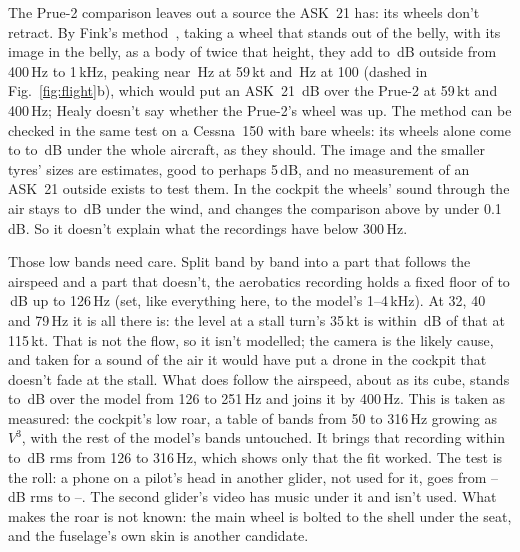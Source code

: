 \documentclass[10pt,a4paper,twocolumn]{article}
\begin{document}
The Prue-2 comparison leaves out a source the ASK~21 has: its wheels don't retract. By Fink's method~\cite{anopp}, taking a wheel that stands out of the belly, with its image in the belly, as a body of twice that height, they add \NWhLo{} to \NWhHi\,dB outside from 400\,Hz to 1\,kHz, peaking near \NWhFLo\,Hz at 59\,kt and \NWhFHi\,Hz at 100 (dashed in Fig.~\ref{fig:flight}b), which would put an ASK~21 \NWhVsPrue\,dB over the Prue-2 at 59\,kt and 400\,Hz; Healy doesn't say whether the Prue-2's wheel was up. The method can be checked in the same test on a Cessna~150 with bare wheels: its wheels alone come to \NWhCeLo{} to \NWhCeHi\,dB under the whole aircraft, as they should. The image and the smaller tyres' sizes are estimates, good to perhaps 5\,dB, and no measurement of an ASK~21 outside exists to test them. In the cockpit the wheels' sound through the air stays \NWhInHi{} to \NWhInLo\,dB under the wind, and changes the comparison above by under 0.1\,dB. So it doesn't explain what the recordings have below 300\,Hz.

Those low bands need care. Split band by band into a part that follows the airspeed and a part that doesn't, the aerobatics recording holds a fixed floor of \NRoFloorLo{} to \NRoFloorHi\,dB up to 126\,Hz (set, like everything here, to the model's 1--4\,kHz). At 32, 40 and 79\,Hz it is all there is: the level at a stall turn's 35\,kt is within \NRoFlat\,dB of that at 115\,kt. That is not the flow, so it isn't modelled; the camera is the likely cause, and taken for a sound of the air it would have put a drone in the cockpit that doesn't fade at the stall. What does follow the airspeed, about as its cube, stands \NRoOverLo{} to \NRoOverHi\,dB over the model from 126 to 251\,Hz and joins it by 400\,Hz. This is taken as measured: the cockpit's low roar, a table of bands from 50 to 316\,Hz growing as $V^3$, with the rest of the model's bands untouched. It brings that recording within \NRoFitLo{} to \NRoFitHi\,dB rms from 126 to 316\,Hz, which shows only that the fit worked. The test is the roll: a phone on a pilot's head in another glider, not used for it, goes from \NRoRollWithoutLo--\NRoRollWithoutHi\,dB rms to \NRoRollWithLo--\NRoRollWithHi. The second glider's video has music under it and isn't used. What makes the roar is not known: the main wheel is bolted to the shell under the seat, and the fuselage's own skin is another candidate.
\end{document}
